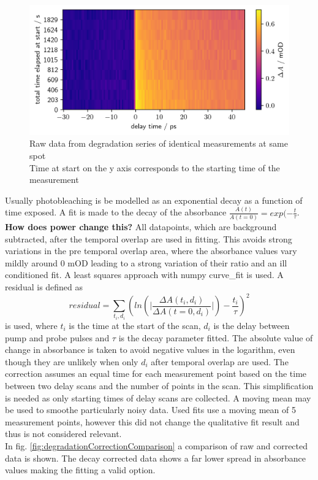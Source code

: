 \documentclass[twoside,openright]{scrreprt}
\begin{document}
\begin{figure}[hbtp]
\centering
\includegraphics[width=\linewidth]{images/DegradationRAWPump653Probe493.png}
\caption{Raw data from degradation series of identical measurements at same spot\\
Time at start on the y axis corresponds to the starting time of the measurement\label{fig:rawDegradation}}
\end{figure}
Usually photobleaching is be modelled as an exponential decay as a function of time exposed. A fit is made to the decay of the absorbance $\frac{A\left(t\right)}{A\left(t=0\right)} = exp(-\frac{t}{\tau}$. \textbf{How does power change this?}
All datapoints, which are background subtracted, after the temporal overlap are used in fitting. This avoids strong variations in the pre temporal overlap area, where the absorbance values vary mildly around 0 mOD leading to a strong variation of their ratio and an ill conditioned fit. A least squares approach with numpy curve\_fit is used. A residual is defined as
\begin{equation}
residual = \sum_{t_i,d_i} \left(ln\left(\lvert\frac{\Delta A(t_i,d_i)}{\Delta A(t=0,d_i)}\rvert\right)- \frac{t_i}{\tau}\right)^2
\end{equation}
is used, where $t_i$ is the time at the start of the scan, $d_i$ is the delay between pump and probe pulses and $\tau$ is the decay parameter fitted. The absolute value of change in absorbance is taken to avoid negative values in the logarithm, even though they are unlikely when only $d_i$ after temporal overlap are used. The correction assumes an equal time for each measurement point based on the time between two delay scans and the number of points in the scan. This simplification is needed as only starting times of delay scans are collected. A moving mean may be used to smoothe particularly noisy data. Used fits use a moving mean of 5 measurement points, however this did not change the qualitative fit result and thus is not considered relevant.\\
In fig. \ref{fig:degradationCorrectionComparison} a comparison of raw and corrected data is shown. The decay corrected data shows a far lower spread in absorbance values making the fitting a valid option.\\
\end{document}
